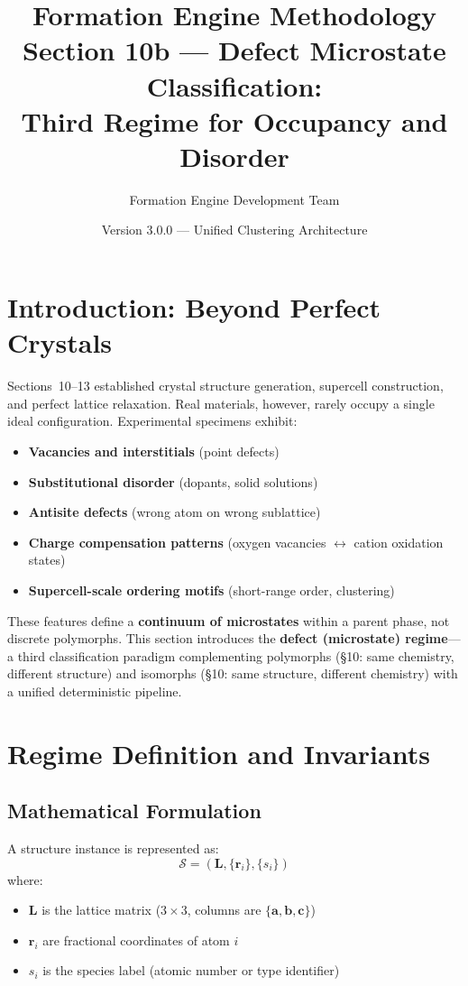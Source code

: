 \documentclass[11pt]{article}
\title{\textbf{Formation Engine Methodology} \\
\Large Section 10b — Defect Microstate Classification:\\
Third Regime for Occupancy and Disorder}
\author{Formation Engine Development Team}
\date{Version 3.0.0 — Unified Clustering Architecture}
\begin{document}
\maketitle

\section{Introduction: Beyond Perfect Crystals}
\label{sec:defect-intro}

Sections~10--13 established crystal structure generation, supercell construction,
and perfect lattice relaxation. Real materials, however, rarely occupy a single
ideal configuration. Experimental specimens exhibit:
\begin{itemize}
  \item \textbf{Vacancies and interstitials} (point defects)
  \item \textbf{Substitutional disorder} (dopants, solid solutions)
  \item \textbf{Antisite defects} (wrong atom on wrong sublattice)
  \item \textbf{Charge compensation patterns} (oxygen vacancies $\leftrightarrow$
        cation oxidation states)
  \item \textbf{Supercell-scale ordering motifs} (short-range order, clustering)
\end{itemize}

These features define a \textbf{continuum of microstates} within a parent phase,
not discrete polymorphs. This section introduces the \textbf{defect (microstate)
regime}---a third classification paradigm complementing polymorphs
(\S10: same chemistry, different structure) and isomorphs (\S10: same structure,
different chemistry) with a unified deterministic pipeline.

\section{Regime Definition and Invariants}

\subsection{Mathematical Formulation}

A structure instance is represented as:
\begin{equation}
\label{eq:struct-rep}
\mathcal{S} = (\mathbf{L}, \{\mathbf{r}_i\}, \{s_i\})
\end{equation}
where:
\begin{itemize}
  \item $\mathbf{L}$ is the lattice matrix ($3 \times 3$, columns are
        $\{\mathbf{a}, \mathbf{b}, \mathbf{c}\}$)
  \item $\mathbf{r}_i$ are fractional coordinates of atom $i$
  \item $s_i$ is the species label (atomic number or type identifier)
\end{itemize}
\end{document}
